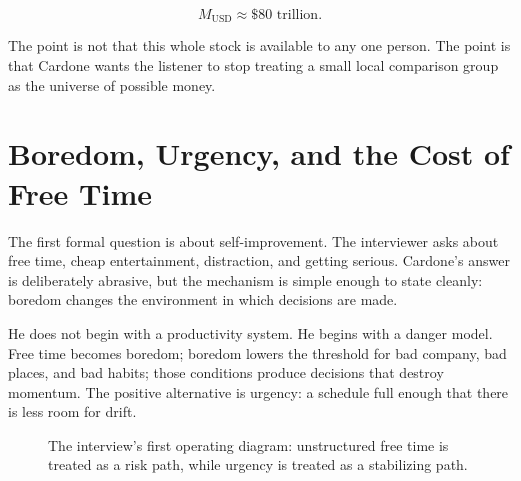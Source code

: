 \begin{equation}
M_{\mathrm{USD}} \approx \$80\text{ trillion}.
\end{equation}

The point is not that this whole stock is available to any one person. The point is that Cardone wants the listener to stop treating a small local comparison group as the universe of possible money.

\section{Boredom, Urgency, and the Cost of Free Time}

The first formal question is about self-improvement. The interviewer asks about free time, cheap entertainment, distraction, and getting serious. Cardone's answer is deliberately abrasive, but the mechanism is simple enough to state cleanly: boredom changes the environment in which decisions are made.

He does not begin with a productivity system. He begins with a danger model. Free time becomes boredom; boredom lowers the threshold for bad company, bad places, and bad habits; those conditions produce decisions that destroy momentum. The positive alternative is urgency: a schedule full enough that there is less room for drift.

\begin{figure}
\centering
{}
\caption{The interview's first operating diagram: unstructured free time is treated as a risk path, while urgency is treated as a stabilizing path.}
\end{figure}

